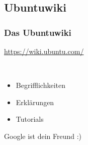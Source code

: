 \documentclass{beamer}
\begin{document}
        \subsection{Ubuntuwiki}
            \begin{frame}
          		\frametitle{Das Ubuntuwiki}
          		\begin{center}
            		\begin{minipage}{0.44\textwidth}
            		    \url{https://wiki.ubuntu.com/}\vspace{1cm}
            		\end{minipage}\\
            		\begin{minipage}{0.5\textwidth}
            		    \begin{itemize}
            		        \item Begrifflichkeiten
            		        \item Erklärungen
            		        \item Tutorials
            		    \end{itemize} \vspace{1cm}
            		    Google ist dein Freund :)
            		\end{minipage}
        		\end{center}
        	\end{frame}
        	
\end{document}
